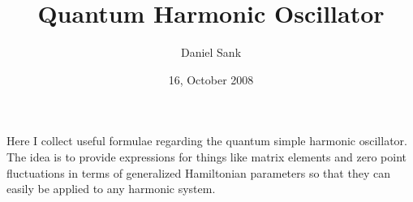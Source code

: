 \documentclass{article}
\title{Quantum Harmonic Oscillator}
\author{Daniel Sank}
\date{16, October 2008}
\begin{document}
\maketitle

Here I collect useful formulae regarding the quantum simple harmonic oscillator.
The idea is to provide expressions for things like matrix elements and zero point fluctuations in terms of generalized Hamiltonian parameters so that they can easily be applied to any harmonic system.

\tableofcontents




\end{document}
